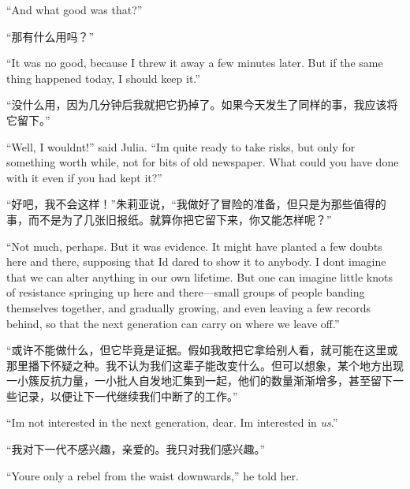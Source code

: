 \begin{paracol}{2}
\switchcolumn*

``And what good was that?''

\switchcolumn

``那有什么用吗？''

\switchcolumn*

``It was no good, because I threw it away a few minutes later. But if the
same thing happened today, I should keep it.''

\switchcolumn

``没什么用，因为几分钟后我就把它扔掉了。如果今天发生了同样的事，我应该将它留下。''

\switchcolumn*

``Well, I wouldn\textquotesingle t!'' said Julia. ``I\textquotesingle m
quite ready to take risks, but only for something worth while, not for
bits of old newspaper. What could you have done with it even if you had
kept it?''

\switchcolumn

``好吧，我不会这样！''朱莉亚说，``我做好了冒险的准备，但只是为那些值得的事，而不是为了几张旧报纸。就算你把它留下来，你又能怎样呢？''

\switchcolumn*

``Not much, perhaps. But it was evidence. It might have planted a few
doubts here and there, supposing that I\textquotesingle d dared to show
it to anybody. I don\textquotesingle t imagine that we can alter
anything in our own lifetime. But one can imagine little knots of
resistance springing up here and there---small groups of people banding
themselves together, and gradually growing, and even leaving a few
records behind, so that the next generation can carry on where we leave
off.''

\switchcolumn

``或许不能做什么，但它毕竟是证据。假如我敢把它拿给别人看，就可能在这里或那里播下怀疑之种。我不认为我们这辈子能改变什么。但可以想象，某个地方出现一小簇反抗力量，一小批人自发地汇集到一起，他们的数量渐渐增多，甚至留下一些记录，以便让下一代继续我们中断了的工作。''

\switchcolumn*

``I\textquotesingle m not interested in the next generation, dear.
I\textquotesingle m interested in \emph{us}.''

\switchcolumn

``我对下一代不感兴趣，亲爱的。我只对我们感兴趣。''

\switchcolumn*

``You\textquotesingle re only a rebel from the waist downwards,'' he told
her.


\end{paracol}
